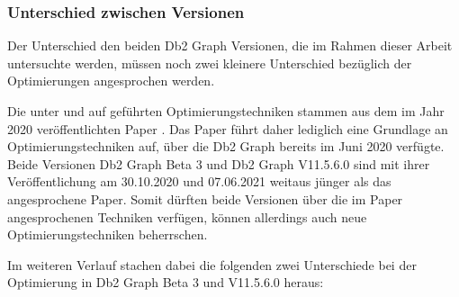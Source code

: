 \subsubsection{Unterschied zwischen Versionen}
\label{subsubsec:optimierung:unterschied_versionen}
Der Unterschied den beiden Db2 Graph Versionen, die im Rahmen dieser Arbeit untersuchte werden, müssen noch zwei kleinere Unterschied bezüglich der Optimierungen angesprochen werden. 

Die unter  und  auf geführten Optimierungstechniken stammen aus dem im Jahr 2020 veröffentlichten Paper \cite{sigmod_tian}. Das Paper führt daher lediglich eine Grundlage an Optimierungstechniken auf, über die Db2 Graph bereits im Juni 2020 verfügte. Beide Versionen Db2 Graph Beta 3 und Db2 Graph V11.5.6.0 sind mit ihrer Veröffentlichung am 30.10.2020 und 07.06.2021 weitaus jünger als das angesprochene Paper. Somit dürften beide Versionen über die im Paper angesprochenen Techniken verfügen, können allerdings auch neue Optimierungstechniken beherrschen. 

Im weiteren Verlauf stachen dabei die folgenden zwei Unterschiede bei der Optimierung in Db2 Graph Beta 3 und V11.5.6.0 heraus:

